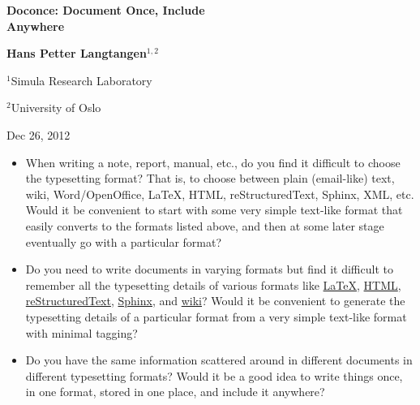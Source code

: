\documentclass[%
oneside,                 %
final,                   %
10pt]{article}
\begin{document}





\begin{center}
{\LARGE\bf Doconce: Document Once, Include \\ [1.5mm] Anywhere}
\end{center}





\begin{center}
{\bf Hans Petter Langtangen${}^{1, 2}$} \\ [0mm]
\end{center}

\begin{center}
\centerline{{\small ${}^1$Simula Research Laboratory}}
\centerline{{\small ${}^2$University of Oslo}}
\end{center}





\begin{center}
Dec 26, 2012
\end{center}

\vspace{1cm}



\begin{itemize}
 \item When writing a note, report, manual, etc., do you find it difficult
   to choose the typesetting format? That is, to choose between plain
   (email-like) text, wiki, Word/OpenOffice, {\LaTeX}, HTML,
   reStructuredText, Sphinx, XML, etc.  Would it be convenient to
   start with some very simple text-like format that easily converts
   to the formats listed above, and then at some later stage
   eventually go with a particular format?

 \item Do you need to write documents in varying formats but find it
   difficult to remember all the typesetting details of various
   formats like \href{{http://refcards.com/docs/silvermanj/amslatex/LaTeXRefCard.v2.0.pdf}}{LaTeX}, \href{{http://www.htmlcodetutorial.com/}}{HTML}, \href{{http://docutils.sourceforge.net/docs/ref/rst/restructuredtext.html}}{reStructuredText}, \href{{http://sphinx.pocoo.org/contents.html}}{Sphinx}, and \href{{http://code.google.com/p/support/wiki/WikiSyntax}}{wiki}? Would it be convenient
   to generate the typesetting details of a particular format from a
   very simple text-like format with minimal tagging?

 \item Do you have the same information scattered around in different
   documents in different typesetting formats? Would it be a good idea
   to write things once, in one format, stored in one place, and
   include it anywhere?
\end{itemize}
\end{document}
